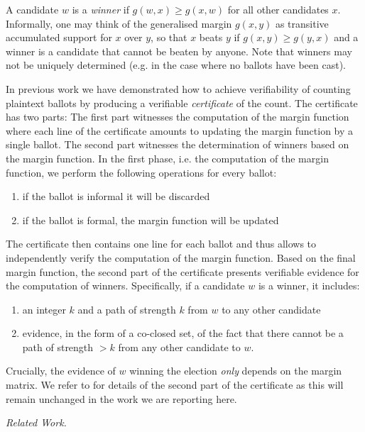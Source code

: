 \documentclass{llncs}
\begin{document}
  A candidate $w$ is a \emph{winner} if $g(w, x) \geq g(x, w)$ for
  all other candidates $x$. Informally, one may think of the
  generalised margin $g(x, y)$ as transitive accumulated support for
  $x$ over $y$, so that $x$ beats $y$ if $g(x,y) \geq g(y, x)$ and a
  winner is a candidate that cannot be beaten by anyone. Note that
  winners may not be uniquely determined (e.g. in the case where no
  ballots have been cast).

  In previous work \cite{Pattinson:2017:SVE} we have demonstrated
  how to achieve verifiability of counting plaintext ballots by
  producing a verifiable \emph{certificate} of the count. The
  certificate has two parts: The first part witnesses the
  computation of the margin function where each line of the
  certificate amounts to updating the margin function by a single
  ballot. The second part witnesses the determination of winners
  based on the margin function. In the first phase, i.e. the
  computation of the margin function, we perform the following
  operations for every ballot:
  \begin{enumerate}
    \item if the ballot is informal it will be discarded
    \item if the ballot is formal, the margin function will be
    updated
  \end{enumerate}
  The certificate then contains one line for each ballot and thus
  allows to independently verify the computation of the margin
  function. Based on the final margin function, the second part of
  the certificate presents verifiable evidence for the computation
  of winners. Specifically, if a candidate $w$ is a winner, it
  includes:
  \begin{enumerate}
    \item an integer $k$ and a path of strength $k$ from $w$ to any
    other candidate
    \item evidence, in the form of a co-closed set, of the fact that
    there cannot be a path of strength $> k$ from any other
    candidate to $w$.
  \end{enumerate}
  Crucially, the evidence of $w$ winning the election \emph{only}
  depends on the margin matrix. 
  We refer to \cite{Pattinson:2017:SVE} for details of the second
  part of the certificate as this will remain unchanged in the work
  we are reporting here.
    
  \smallskip\emph{Related Work.} 
\end{document}
